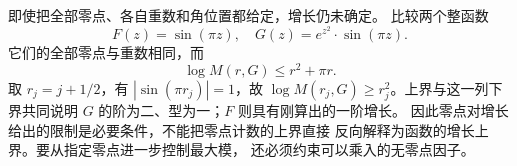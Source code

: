 \ProseParagraphBreak
即使把全部零点、各自重数和角位置都给定，增长仍未确定。
比较两个整函数
\[
 F(z)=\sin(\pi z),\quad G(z)=e^{z^2}\cdot\sin(\pi z).
\]
它们的全部零点与重数相同，而
\[
 \log M(r,G)\le r^2+\pi r.
\]
取 \(r_j=j+1/2\)，有 \(|\sin(\pi r_j)|=1\)，故
\(\log M(r_j,G)\ge r_j^2\)。上界与这一列下界共同说明
\(G\) 的阶为二、型为一；\(F\) 则具有刚算出的一阶增长。
因此零点对增长给出的限制是必要条件，不能把零点计数的上界直接
反向解释为函数的增长上界。要从指定零点进一步控制最大模，
还必须约束可以乘入的无零点因子。
